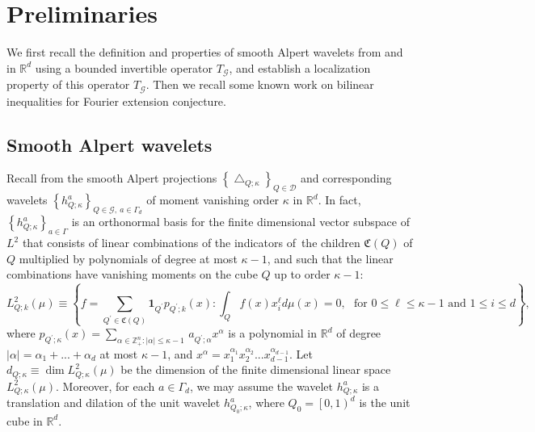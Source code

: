 \documentclass{amsart}%
\theoremstyle{plain}
\numberwithin{equation}{section}
\begin{document}
\section{Preliminaries}

We first recall the definition and properties of smooth Alpert wavelets from
\cite[Section 2]{Saw7} and \cite{Saw8} in $\mathbb{R}^{d}$ using a bounded
invertible operator $T_{\mathcal{G}}$, and establish a localization property
of this operator $T_{\mathcal{G}}$. Then we recall some known work on bilinear
inequalities for Fourier extension conjecture.

\subsection{Smooth Alpert wavelets}

Recall from \cite{Saw7} the smooth Alpert projections $\left\{  \bigtriangleup
_{Q;\kappa}\right\}  _{Q\in\mathcal{D}}$ and corresponding wavelets $\left\{
h_{Q;\kappa}^{a}\right\}  _{Q\in\mathcal{G},\ a\in\Gamma_{d}}$ of moment
vanishing order $\kappa$ in $\mathbb{R}^{d}$. In fact, $\left\{  h_{Q;\kappa
}^{a}\right\}  _{a\in\Gamma}$ is an orthonormal basis for the finite
dimensional vector subspace of $L^{2}$ that consists of linear combinations of
the indicators of\ the children $\mathfrak{C}\left(  Q\right)  $ of $Q$
multiplied by polynomials of degree at most $\kappa-1$, and such that the
linear combinations have vanishing moments on the cube $Q$ up to order
$\kappa-1$:%
\[
L_{Q;k}^{2}\left(  \mu\right)  \equiv\left\{  f=%
{\displaystyle\sum\limits_{Q^{\prime}\in\mathfrak{C}\left(  Q\right)  }}
\mathbf{1}_{Q^{\prime}}p_{Q^{\prime};k}\left(  x\right)  :\int_{Q}f\left(
x\right)  x_{i}^{\ell}d\mu\left(  x\right)  =0,\ \ \ \text{for }0\leq\ell
\leq\kappa-1\text{ and }1\leq i\leq d\right\}  ,
\]
where $p_{Q^{\prime};\kappa}\left(  x\right)  =\sum_{\alpha\in\mathbb{Z}%
_{+}^{n}:\left\vert \alpha\right\vert \leq\kappa-1\ }a_{Q^{\prime};\alpha
}x^{\alpha}$ is a polynomial in $\mathbb{R}^{d}$ of degree $\left\vert
\alpha\right\vert =\alpha_{1}+...+\alpha_{d}$ at most $\kappa-1$, and
$x^{\alpha}=x_{1}^{\alpha_{1}}x_{2}^{\alpha_{2}}...x_{d-1}^{\alpha_{d-1}}$.
Let $d_{Q;\kappa}\equiv\dim L_{Q;\kappa}^{2}\left(  \mu\right)  $ be the
dimension of the finite dimensional linear space $L_{Q;\kappa}^{2}\left(
\mu\right)  $. Moreover, for each $a\in\Gamma_{d}$, we may assume the wavelet
$h_{Q;\kappa}^{a}$ is a translation and dilation of the unit wavelet
$h_{Q_{0};\kappa}^{a}$, where $Q_{0}=\left[  0,1\right)  ^{d}$ is the unit
cube in $\mathbb{R}^{d}$.
\end{document}
